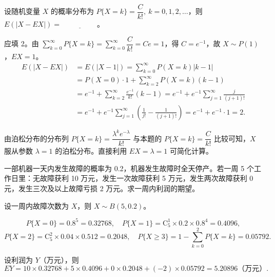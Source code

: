﻿\documentclass[lang=cn,11pt]{elegantbook}
\begin{document}
\begin{exercise}\label{exer:4-5-poisson}
设随机变量 \(X\) 的概率分布为 \(P\{X=k\} = \dfrac{C}{k!},\ k=0,1,2,\dots\)，则 \(E(|X - EX|) =\,\underline{\hspace{2cm}}\)。
\end{exercise}
\begin{solution}
应填 2。由 \(\sum\limits_{k=0}^{\infty} P\{X=k\} = \sum\limits_{k=0}^{\infty} \dfrac{C}{k!} = Ce = 1\)，得 \(C = e^{-1}\)，故 \(X \sim P(1)\)，\(EX = 1\)。
\[
\begin{aligned}
E(|X - EX|) &= E(|X - 1|) = \sum_{k=0}^{\infty} P(X=k)|k-1| \\
&= P(X=0) \cdot 1 + \sum_{k=2}^{\infty} P(X=k)(k-1) \\
&= e^{-1} + \sum_{k=2}^{\infty} \frac{e^{-1}}{k!}(k-1) = e^{-1} + e^{-1}\sum_{j=1}^{\infty}\frac{j}{(j+1)!} \\
&= e^{-1} + e^{-1}\sum_{j=1}^{\infty}\left(\frac{1}{j!} - \frac{1}{(j+1)!}\right) = e^{-1} + e^{-1}\cdot 1 = 2.
\end{aligned}
\]
\end{solution}

\begin{note}
由泊松分布的分布列 \(P\{X=k\} = \dfrac{\lambda^k e^{-\lambda}}{k!}\) 与本题的 \(P\{X=k\} = \dfrac{C}{k!}\) 比较可知，\(X\) 服从参数 \(\lambda = 1\) 的泊松分布。直接利用 \(EX = \lambda = 1\) 可简化计算。
\end{note}


\begin{exercise}\label{exer:4-s11-machine}
一部机器一天内发生故障的概率为 0.2，机器发生故障时全天停产。若一周 5 个工作日里：无故障获利 10 万元，发生一次故障获利 5 万元，发生两次故障获利 0 元，发生三次及以上故障亏损 2 万元。求一周内利润的期望。
\end{exercise}

\begin{solution}
设一周内故障次数为 \(X\)，则 \(X \sim B(5, 0.2)\)。

\[
P\{X=0\} = 0.8^5 = 0.32768,\quad P\{X=1\} = \mathrm{C}_5^1 \times 0.2 \times 0.8^4 = 0.4096,
\]
\[
P\{X=2\} = \mathrm{C}_5^2 \times 0.04 \times 0.512 = 0.2048,\quad P\{X \geqslant 3\} = 1 - \sum_{k=0}^{2}P\{X=k\} = 0.05792.
\]

设利润为 \(Y\)（万元），则
\[
EY = 10 \times 0.32768 + 5 \times 0.4096 + 0 \times 0.2048 + (-2) \times 0.05792 = 5.20896 \text{（万元）}.
\]
\end{solution}
\end{document}
